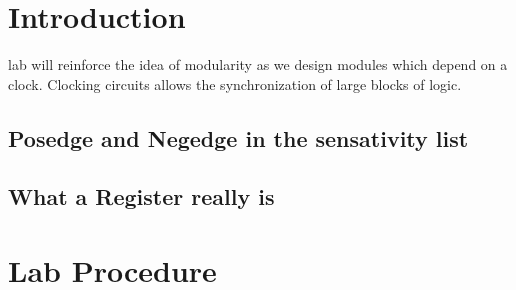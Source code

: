 
\newcommand{\TITLE}{Lab Four: Shift registers, Counters}
\newcommand{\KEYWORDS}{Logic Gates, Verilog, FPGA, Signaltap, Synthesis}
\newcommand{\ABSTRACT}{Two input logic gates are synthesized for the Altera Cyclone IV FPGA using the Quartus IDE. The logic gates are verified using a System Verilog testbench and Mentor's Modelsim HDL simulator}




\section{\bfseries Introduction}
   lab will reinforce the idea of modularity as we design modules which depend on a clock. Clocking circuits allows the synchronization of large blocks of logic. 

  \subsection{Posedge and Negedge in the sensativity list}

  \subsection{What a Register really is}

\section{\bfseries Lab Procedure}
  
